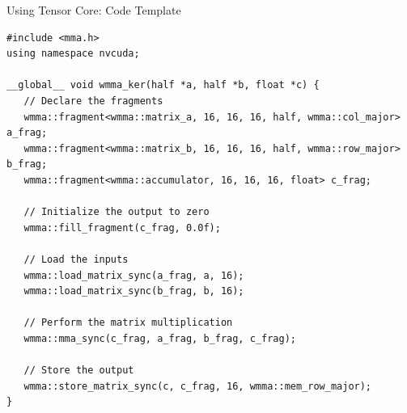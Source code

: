 \documentclass[dvipdfmx, 11pt, aspectratio=169]{beamer}   %
\begin{document}
\begin{frame}[fragile]{Using Tensor Core: Code Template}
\begin{lstlisting}[language=CUDA, basicstyle=\ttfamily\tiny]
#include <mma.h>
using namespace nvcuda;

__global__ void wmma_ker(half *a, half *b, float *c) {
   // Declare the fragments
   wmma::fragment<wmma::matrix_a, 16, 16, 16, half, wmma::col_major> a_frag;
   wmma::fragment<wmma::matrix_b, 16, 16, 16, half, wmma::row_major> b_frag;
   wmma::fragment<wmma::accumulator, 16, 16, 16, float> c_frag;

   // Initialize the output to zero
   wmma::fill_fragment(c_frag, 0.0f);

   // Load the inputs
   wmma::load_matrix_sync(a_frag, a, 16);
   wmma::load_matrix_sync(b_frag, b, 16);

   // Perform the matrix multiplication
   wmma::mma_sync(c_frag, a_frag, b_frag, c_frag);

   // Store the output
   wmma::store_matrix_sync(c, c_frag, 16, wmma::mem_row_major);
}
\end{lstlisting}
\end{frame}
\end{document}
